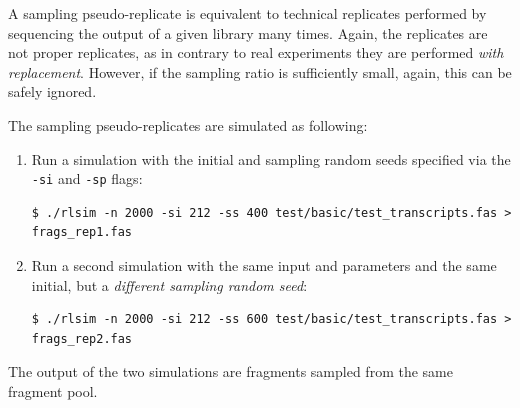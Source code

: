 A sampling pseudo-replicate is equivalent to technical replicates performed by sequencing the output of a given library many times.
Again, the \rlsim replicates are not proper replicates, as in contrary to real experiments they are performed \emph{with replacement}. However, if the sampling ratio is sufficiently small, again, this can be safely ignored.

The sampling pseudo-replicates are simulated as following:

\begin{enumerate}
    \item{Run a simulation with the initial and sampling random seeds specified via the \texttt{-si} and \texttt{-sp} flags:
        \begin{verbatim}
$ ./rlsim -n 2000 -si 212 -ss 400 test/basic/test_transcripts.fas > frags_rep1.fas
        \end{verbatim}
    }
    \item{Run a second simulation with the same input and parameters and the same initial, but a \emph{different sampling random seed}:
        \begin{verbatim}
$ ./rlsim -n 2000 -si 212 -ss 600 test/basic/test_transcripts.fas > frags_rep2.fas
        \end{verbatim}
    }
\end{enumerate}

The output of the two simulations are fragments sampled from the same fragment pool.

